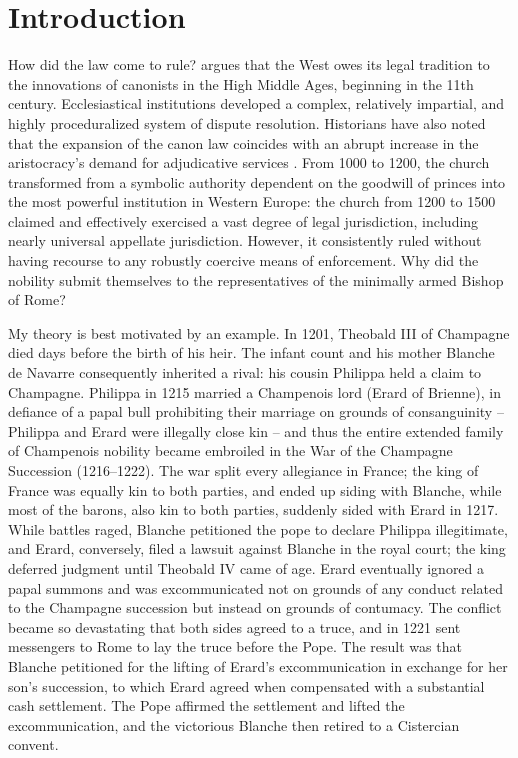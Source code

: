 \documentclass[12pt]{article}
\theoremstyle{definition}
\theoremstyle{remark}
\begin{document}
\section{Introduction}
\label{sec:intro}

How did the law come to rule? \citet{berman_1983} argues that the West owes its legal tradition to the innovations of canonists in the High Middle Ages, beginning in the 11th century. Ecclesiastical institutions developed a complex, relatively impartial, and highly proceduralized system of dispute resolution. Historians have also noted that the expansion of the canon law coincides with an abrupt increase in the aristocracy’s demand for adjudicative services \citep{davray_2005}. From 1000 to 1200, the church transformed from a symbolic authority dependent on the goodwill of princes into the most powerful institution in Western Europe: the church from 1200 to 1500 claimed and effectively exercised a vast degree of legal jurisdiction, including nearly universal appellate jurisdiction. However, it consistently ruled without having recourse to any robustly coercive means of enforcement. Why did the nobility submit themselves to the representatives of the minimally armed Bishop of Rome?

My theory is best motivated by an example. In 1201, Theobald III of Champagne died days before the birth of his heir. The infant count and his mother Blanche de Navarre consequently inherited a rival: his cousin Philippa held a claim to Champagne. Philippa in 1215 married a Champenois lord (Erard of Brienne), in defiance of a papal bull prohibiting their marriage on grounds of consanguinity -- Philippa and Erard were illegally close kin -- and thus the entire extended family of Champenois nobility became embroiled in the War of the Champagne Succession (1216--1222). The war split every allegiance in France; the king of France was equally kin to both parties, and ended up siding with Blanche, while most of the barons, also kin to both parties, suddenly sided with Erard in 1217. While battles raged, Blanche petitioned the pope to declare Philippa illegitimate, and Erard, conversely, filed a lawsuit against Blanche in the royal court; the king deferred judgment until Theobald IV came of age. Erard eventually ignored a papal summons and was excommunicated not on grounds of any conduct related to the Champagne succession but instead on grounds of contumacy. The conflict became so devastating that both sides agreed to a truce, and in 1221 sent messengers to Rome to lay the truce before the Pope. The result was that Blanche petitioned for the lifting of Erard's excommunication in exchange for her son's succession, to which Erard agreed when compensated with a substantial cash settlement. The Pope affirmed the settlement and lifted the excommunication, and the victorious Blanche then retired to a Cistercian convent.
\end{document}
